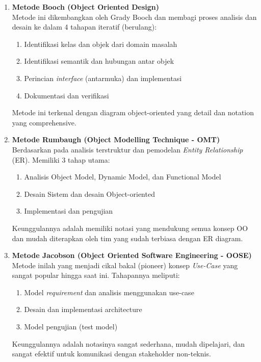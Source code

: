 \documentclass[12pt,a4paper]{article}
\begin{document}
\begin{enumerate}
    \item \textbf{Metode Booch (Object Oriented Design)}\\
    Metode ini dikembangkan oleh Grady Booch dan membagi proses analisis dan desain ke dalam 4 tahapan iteratif (berulang): 
    \begin{enumerate}[label=(\arabic*)]
        \item Identifikasi kelas dan objek dari domain masalah
        \item Identifikasi semantik dan hubungan antar objek
        \item Perincian \textit{interface} (antarmuka) dan implementasi
        \item Dokumentasi dan verifikasi
    \end{enumerate}
    Metode ini terkenal dengan diagram object-oriented yang detail dan notation yang comprehensive.
    
    \item \textbf{Metode Rumbaugh (Object Modelling Technique - OMT)}\\
    Berdasarkan pada analisis terstruktur dan pemodelan \textit{Entity Relationship} (ER). Memiliki 3 tahap utama: 
    \begin{enumerate}[label=(\arabic*)]
        \item Analisis Object Model, Dynamic Model, dan Functional Model
        \item Desain Sistem dan desain Object-oriented
        \item Implementasi dan pengujian
    \end{enumerate}
    Keunggulannya adalah memiliki notasi yang mendukung semua konsep OO dan mudah diterapkan oleh tim yang sudah terbiasa dengan ER diagram.
    
    \item \textbf{Metode Jacobson (Object Oriented Software Engineering - OOSE)}\\
    Metode inilah yang menjadi cikal bakal (pioneer) konsep \textit{Use-Case} yang sangat popular hingga saat ini. Tahapannya meliputi: 
    \begin{enumerate}[label=(\arabic*)]
        \item Model \textit{requirement} dan analisis menggunakan use-case
        \item Desain dan implementasi architecture
        \item Model pengujian (test model)
    \end{enumerate}
    Keunggulannya adalah notasinya sangat sederhana, mudah dipelajari, dan sangat efektif untuk komunikasi dengan stakeholder non-teknis.
    

\end{enumerate}
\end{document}

